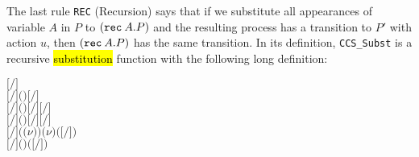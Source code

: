 The last rule \texttt{REC} (Recursion)
 says that if we substitute all appearances of variable $A$ in $P$ to
$({\tt rec}\: A . P)$ and the resulting process has a transition to $P'$
with action $u$, then $({\tt rec}\: A . P)$ has the same
transition. In its definition, \texttt{CCS_Subst} is a recursive \hl{substitution} function
with the following long definition:
\begin{alltt}
    \ensuremath{[}\ensuremath{/}\ensuremath{]}  \HOLSymConst{\HOLTokenDefEquality{}} 
    \ensuremath{[}\ensuremath{/}\ensuremath{]} \ensuremath{(}\HOLSymConst{\ensuremath{\ldotp}}\ensuremath{)} \HOLSymConst{\HOLTokenDefEquality{}} \HOLSymConst{\ensuremath{\ldotp}}\ensuremath{[}\ensuremath{/}\ensuremath{]} 
    \ensuremath{[}\ensuremath{/}\ensuremath{]} \ensuremath{(} \HOLSymConst{\ensuremath{+}} \ensuremath{)} \HOLSymConst{\HOLTokenDefEquality{}} \ensuremath{[}\ensuremath{/}\ensuremath{]}  \HOLSymConst{\ensuremath{+}} \ensuremath{[}\ensuremath{/}\ensuremath{]} 
    \ensuremath{[}\ensuremath{/}\ensuremath{]} \ensuremath{(} \HOLSymConst{\ensuremath{\mid}} \ensuremath{)} \HOLSymConst{\HOLTokenDefEquality{}} \ensuremath{[}\ensuremath{/}\ensuremath{]}  \HOLSymConst{\ensuremath{\mid}} \ensuremath{[}\ensuremath{/}\ensuremath{]} 
    \ensuremath{[}\ensuremath{/}\ensuremath{]} \ensuremath{(}\ensuremath{(\nu}\ensuremath{)} \ensuremath{)} \HOLSymConst{\HOLTokenDefEquality{}} \ensuremath{(\nu}\ensuremath{)} \ensuremath{(}\ensuremath{[}\ensuremath{/}\ensuremath{]} \ensuremath{)}
    \ensuremath{[}\ensuremath{/}\ensuremath{]} \ensuremath{(}  \ensuremath{)} \HOLSymConst{\HOLTokenDefEquality{}}  \ensuremath{(}\ensuremath{[}\ensuremath{/}\ensuremath{]} \ensuremath{)} 

\end{alltt}
